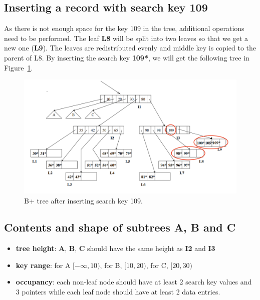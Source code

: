 \subsection{Inserting a record with search key 109}\label{section-2}

As there is not enough space for the key 109 in the tree, additional operations need to be performed.
The leaf \textbf{L8} will be split into two leaves so that we get a new one (\textbf{L9}).
The leaves are redistributed evenly and middle key is copied to the parent of L8. By inserting the search key \textbf{109*}, we will get the following tree in Figure~\ref{fig:q1-3}.

\begin{figure}[H]
  \centering
  \includegraphics[width=0.9\linewidth]{figs/q1-3.png}
  \caption{B+ tree after inserting search key 109.}
  \label{fig:q1-3}
\end{figure}

\subsection{Contents and shape of subtrees A, B and C}\label{section-3}

\begin{itemize}
  \tightlist   
\item \textbf{tree height}: \textbf{A}, \textbf{B}, \textbf{C} should have the same height as \textbf{I2} and \textbf{I3}
\item \textbf{key range}: for A $[-\infty, 10)$, for B, $[10, 20)$, for C, $[20,30)$
\item \textbf{occupancy}:   each non-leaf node should have at least 2 search key values and 3 pointers while  each leaf node should have at least 2 data entries.
\end{itemize}
  